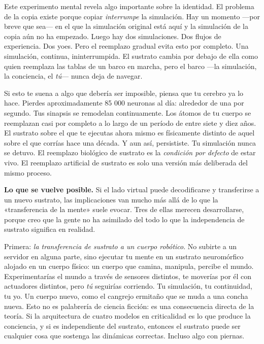 \documentclass[11pt, twoside, openright]{book}
\begin{document}
Este experimento mental revela algo importante sobre la identidad. El problema de la copia existe porque copiar \textit{interrumpe} la simulación. Hay un momento ---por breve que sea--- en el que la simulación original está aquí y la simulación de la copia aún no ha empezado. Luego hay dos simulaciones. Dos flujos de experiencia. Dos yoes. Pero el reemplazo gradual evita esto por completo. Una simulación, continua, ininterrumpida. El sustrato cambia por debajo de ella como quien reemplaza las tablas de un barco en marcha, pero el barco ---la simulación, la conciencia, el \textit{tú}--- nunca deja de navegar.

Si esto te suena a algo que debería ser imposible, piensa que tu cerebro ya lo hace. Pierdes aproximadamente 85 000 neuronas al día: alrededor de una por segundo. Tus sinapsis se remodelan continuamente. Los átomos de tu cuerpo se reemplazan casi por completo a lo largo de un período de entre siete y diez años. El sustrato sobre el que te ejecutas ahora mismo es físicamente distinto de aquel sobre el que corrías hace una década. Y aun así, persististe. Tu simulación nunca se detuvo. El reemplazo biológico de sustrato es la \textit{condición por defecto} de estar vivo. El reemplazo artificial de sustrato es solo una versión más deliberada del mismo proceso.

\textbf{Lo que se vuelve posible.} Si el lado virtual puede decodificarse y transferirse a un nuevo sustrato, las implicaciones van mucho más allá de lo que la «transferencia de la mente» suele evocar. Tres de ellas merecen desarrollarse, porque creo que la gente no ha asimilado del todo lo que la independencia de sustrato significa en realidad.

Primera: \textit{la transferencia de sustrato a un cuerpo robótico}. No subirte a un servidor en alguna parte, sino ejecutar tu mente en un sustrato neuromórfico alojado en un cuerpo físico: un cuerpo que camina, manipula, percibe el mundo. Experimentarías el mundo a través de sensores distintos, te moverías por él con actuadores distintos, pero \textit{tú} seguirías corriendo. Tu simulación, tu continuidad, tu yo. Un cuerpo nuevo, como el cangrejo ermitaño que se muda a una concha nueva. Esto no es palabrería de ciencia ficción: es una consecuencia directa de la teoría. Si la arquitectura de cuatro modelos en criticalidad es lo que produce la conciencia, y si es independiente del sustrato, entonces el sustrato puede ser cualquier cosa que sostenga las dinámicas correctas. Incluso algo con piernas.
\end{document}
